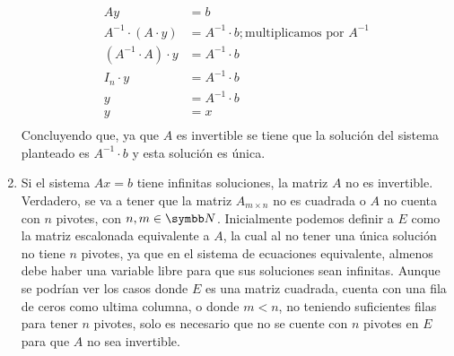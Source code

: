 \begin{enumerate}[label=\listAlph]
\[                \begin{aligned}
                    Ay &= b \\
                    A^{-1} \cdot (A \cdot y) &= A^{-1} \cdot b; \text{multiplicamos por } A^{-1} \\
                    (A^{-1} \cdot A) \cdot y &= A^{-1} \cdot b \\
                    I_n \cdot y &= A^{-1} \cdot b \\
                    y &= A^{-1} \cdot b \\
                    y &= x \\
                \end{aligned}
            \]
            Concluyendo que, ya que \(A\) es invertible se tiene que la solución del sistema planteado es \(A^{-1} \cdot b\) y esta solución es única.
        \setcounter{enumii}{5}
        \item Si el sistema \(Ax = b\) tiene infinitas soluciones, la matriz \(A\) no es invertible. \\
            Verdadero, se va a tener que la matriz \(A_{m \times n}\) no es cuadrada o \(A\) no cuenta con \(n\) pivotes, con \(n, m \in \realN\).
            Inicialmente podemos definir a \(E\) como la matriz escalonada equivalente a \(A\), la cual al no tener una única solución no tiene \(n\)
            pivotes, ya que en el sistema de ecuaciones equivalente, almenos debe haber una variable libre para que sus soluciones sean infinitas. 
            Aunque se podrían ver los casos donde \(E\) es una matriz cuadrada, cuenta con una fila de ceros como ultima columna, o donde \(m < n\),
            no teniendo suficientes filas para tener \(n\) pivotes, solo es necesario que no se cuente con \(n\) pivotes en \(E\) para que \(A\) no 
            sea invertible.
    \end{enumerate}
